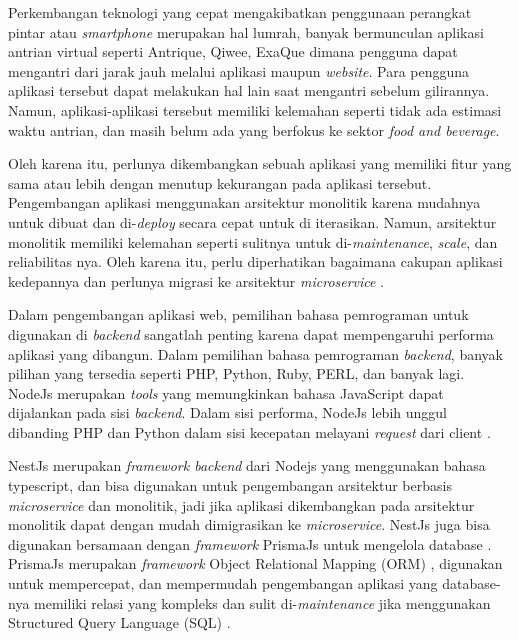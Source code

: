 Perkembangan teknologi yang cepat mengakibatkan penggunaan perangkat pintar atau \textit{smartphone} merupakan hal lumrah, banyak bermunculan aplikasi antrian virtual seperti Antrique, Qiwee, ExaQue dimana pengguna dapat mengantri dari jarak jauh melalui aplikasi maupun \textit{website}. Para pengguna aplikasi tersebut dapat melakukan hal lain saat mengantri sebelum gilirannya. Namun, aplikasi-aplikasi tersebut memiliki kelemahan seperti tidak ada estimasi waktu antrian, dan masih belum ada yang berfokus ke sektor \textit{food and beverage}.

Oleh karena itu, perlunya dikembangkan sebuah aplikasi yang memiliki fitur yang sama atau lebih dengan menutup kekurangan pada aplikasi tersebut. Pengembangan aplikasi menggunakan arsitektur monolitik karena mudahnya untuk dibuat dan di-\textit{deploy} secara cepat untuk di iterasikan. Namun, arsitektur monolitik memiliki kelemahan seperti sulitnya untuk di-\textit{maintenance}, \textit{scale}, dan reliabilitas nya. Oleh karena itu, perlu diperhatikan bagaimana cakupan aplikasi kedepannya dan perlunya migrasi ke arsitektur \textit{microservice} \cite{gos2020comparison} \cite{jatkiewicz2023differences}.

Dalam pengembangan aplikasi web, pemilihan bahasa pemrograman untuk digunakan di \textit{backend} sangatlah penting karena dapat mempengaruhi performa aplikasi yang dibangun. Dalam pemilihan bahasa pemrograman \textit{backend}, banyak pilihan yang tersedia seperti PHP, Python, Ruby, PERL, dan banyak lagi. NodeJs merupakan \textit{tools} yang memungkinkan bahasa JavaScript dapat dijalankan pada sisi \textit{backend}. Dalam sisi performa, NodeJs lebih unggul dibanding PHP dan Python dalam sisi kecepatan melayani \textit{request} dari client \cite{William2020} \cite{Odeniran2023}.

NestJs merupakan \textit{framework backend} dari Nodejs yang menggunakan bahasa typescript, dan bisa digunakan untuk pengembangan arsitektur berbasis \textit{microservice} dan monolitik, jadi jika aplikasi dikembangkan pada arsitektur monolitik dapat dengan mudah dimigrasikan ke \textit{microservice}. NestJs juga bisa digunakan bersamaan dengan \textit{framework} PrismaJs untuk mengelola database \cite{NestJS}. PrismaJs merupakan \textit{framework} Object Relational Mapping (ORM) \cite{Prisma}, digunakan untuk mempercepat, dan mempermudah pengembangan aplikasi yang database-nya memiliki relasi yang kompleks dan sulit di-\textit{maintenance} jika menggunakan Structured Query Language (SQL) \cite{Zmaranda2020}.


